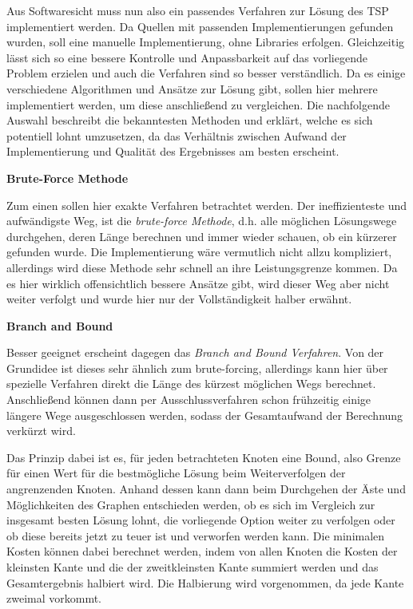Aus Softwaresicht muss nun also ein passendes Verfahren zur Lösung des TSP implementiert werden. Da Quellen mit passenden Implementierungen gefunden wurden, soll eine manuelle Implementierung, ohne Libraries erfolgen. Gleichzeitig lässt sich so eine bessere Kontrolle und Anpassbarkeit auf das vorliegende Problem erzielen und auch die Verfahren sind so besser verständlich. Da es einige verschiedene Algorithmen und Ansätze zur Lösung gibt, sollen hier mehrere implementiert werden, um diese anschließend zu vergleichen. Die nachfolgende Auswahl beschreibt die bekanntesten Methoden und erklärt, welche es sich potentiell lohnt umzusetzen, da das Verhältnis zwischen Aufwand der Implementierung und Qualität des Ergebnisses am besten erscheint.

\textbf{Brute-Force Methode}

Zum einen sollen hier exakte Verfahren betrachtet werden. Der ineffizienteste und aufwändigste Weg, ist die \textit{brute-force Methode}, d.h. alle möglichen Lösungswege durchgehen, deren Länge berechnen und immer wieder schauen, ob ein kürzerer gefunden wurde. Die Implementierung wäre vermutlich nicht allzu kompliziert, allerdings wird diese Methode sehr schnell an ihre Leistungsgrenze kommen. Da es hier wirklich offensichtlich bessere Ansätze gibt, wird dieser Weg aber nicht weiter verfolgt und wurde hier nur der Vollständigkeit halber erwähnt. \cite{oracleTsp}

\textbf{Branch and Bound} 

Besser geeignet erscheint dagegen das \textit{Branch and Bound Verfahren}. Von der Grundidee ist dieses sehr ähnlich zum brute-forcing, allerdings kann hier über spezielle Verfahren direkt die Länge des kürzest möglichen Wegs berechnet. Anschließend können dann per Ausschlussverfahren schon frühzeitig einige längere Wege ausgeschlossen werden, sodass der Gesamtaufwand der Berechnung verkürzt wird. \cite{travelingSalesman}

Das Prinzip dabei ist es, für jeden betrachteten Knoten eine \glqq{}Bound\grqq{}, also Grenze für einen Wert für die bestmögliche Lösung beim Weiterverfolgen der angrenzenden Knoten. Anhand dessen kann dann beim Durchgehen der Äste und Möglichkeiten des Graphen entschieden werden, ob es sich im Vergleich zur insgesamt besten Lösung lohnt, die vorliegende Option weiter zu verfolgen oder ob diese bereits jetzt zu teuer ist und verworfen werden kann. Die minimalen Kosten können dabei berechnet werden, indem von allen Knoten die Kosten der kleinsten Kante und die der zweitkleinsten Kante summiert werden und das Gesamtergebnis halbiert wird. Die Halbierung wird vorgenommen, da jede Kante zweimal vorkommt. \cite{geeksForGeeksBnB}

